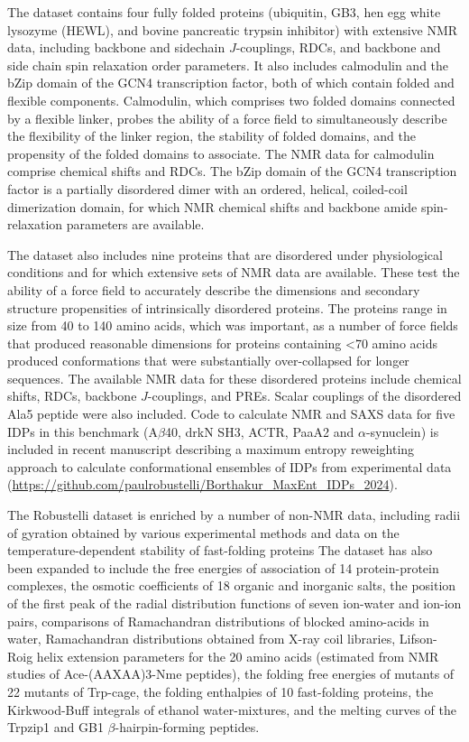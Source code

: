 \documentclass[9pt,review]{livecoms}
\begin{document}
The dataset contains four fully folded proteins (ubiquitin, GB3, hen egg white lysozyme (HEWL), and bovine pancreatic trypsin inhibitor) with extensive NMR data, including backbone and sidechain $J$-couplings, RDCs, and backbone and side chain spin relaxation order parameters.
It also includes calmodulin and the bZip domain of the GCN4 transcription factor, both of which contain folded and flexible components.
Calmodulin, which comprises two folded domains connected by a flexible linker, probes the ability of a force field to simultaneously describe the flexibility of the linker region, the stability of folded domains, and the propensity of the folded domains to associate.
The NMR data for calmodulin comprise chemical shifts and RDCs.
The bZip domain of the GCN4 transcription factor is a partially disordered dimer with an ordered, helical, coiled-coil dimerization domain, for which NMR chemical shifts and backbone amide spin-relaxation parameters are available. 

The dataset also includes nine proteins that are disordered under physiological conditions and for which extensive sets of NMR data are available.
These test the ability of a force field to accurately describe the dimensions and secondary structure propensities of intrinsically disordered proteins.
The proteins range in size from 40 to 140 amino acids, which was important, as a number of force fields that produced reasonable dimensions for proteins containing <70 amino acids produced conformations that were substantially over-collapsed for longer sequences.
The available NMR data for these disordered proteins include chemical shifts, RDCs, backbone $J$-couplings, and PREs.
Scalar couplings of the disordered Ala5 peptide were also included. 
Code to calculate NMR and SAXS data for five IDPs in this benchmark (A$\beta$40, drkN SH3, ACTR, PaaA2 and $\alpha$-synuclein) is included in recent manuscript describing a maximum entropy reweighting approach to calculate conformational ensembles of IDPs from experimental data\cite{borthakur2024determining} (\url{https://github.com/paulrobustelli/Borthakur_MaxEnt_IDPs_2024}).  

The Robustelli dataset is enriched by a number of non-NMR data, including radii of gyration obtained by various experimental methods and data on the temperature-dependent stability of fast-folding proteins
The dataset has also been expanded \cite{piana_development_2020} to include the free energies of association of 14 protein-protein complexes, the osmotic coefficients of 18 organic and inorganic salts, the position of the first peak of the radial distribution functions of seven ion-water and ion-ion pairs, comparisons of Ramachandran distributions of blocked amino-acids in water, Ramachandran distributions obtained from X-ray coil libraries, Lifson-Roig helix extension parameters for the 20 amino acids (estimated from NMR studies of Ace-(AAXAA)3-Nme peptides), the folding free energies of mutants of 22 mutants of Trp-cage, the folding enthalpies of 10 fast-folding proteins, the Kirkwood-Buff integrals of ethanol water-mixtures, and the melting curves of the Trpzip1 and GB1 $\beta$-hairpin-forming peptides.
\end{document}

